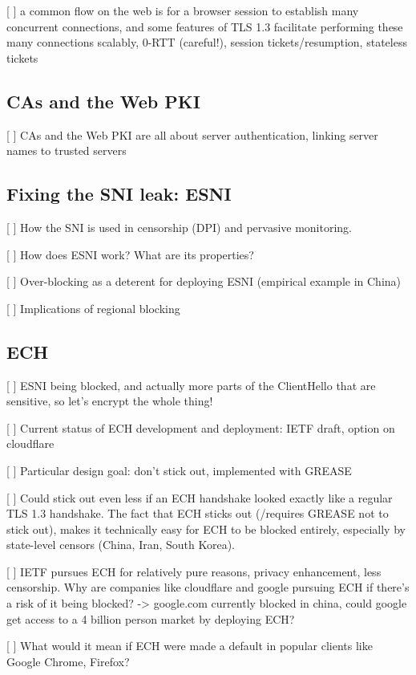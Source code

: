 [ ] a common flow on the web is for a browser session to establish many concurrent connections, and some features of TLS 1.3 facilitate performing these many connections scalably, 0-RTT (careful!), session tickets/resumption, stateless tickets
\subsection{CAs and the Web PKI}

[ ] CAs and the Web PKI are all about server authentication, linking server names to trusted servers
\subsection{Fixing the SNI leak: ESNI}

[ ] How the SNI is used in censorship (DPI) and pervasive monitoring.

[ ] How does ESNI work? What are its properties?

[ ] Over-blocking as a deterent for deploying ESNI (empirical example in China)

[ ] Implications of regional blocking
\subsection{ECH}

[ ] ESNI being blocked, and actually more parts of the ClientHello that are sensitive, so let's encrypt the whole thing!

[ ] Current status of ECH development and deployment: IETF draft, option on cloudflare

[ ] Particular design goal: don't stick out, implemented with GREASE

[ ] Could stick out even less if an ECH handshake looked exactly like a regular TLS 1.3 handshake. The fact that ECH sticks out (/requires GREASE not to stick out), makes it technically easy for ECH to be blocked entirely, especially by state-level censors (China, Iran, South Korea).

[ ] IETF pursues ECH for relatively pure reasons, privacy enhancement, less censorship. Why are companies like cloudflare and google pursuing ECH if there's a risk of it being blocked? -> google.com currently blocked in china, could google get access to a 4 billion person market by deploying ECH?

[ ] What would it mean if ECH were made a default in popular clients like Google Chrome, Firefox?


